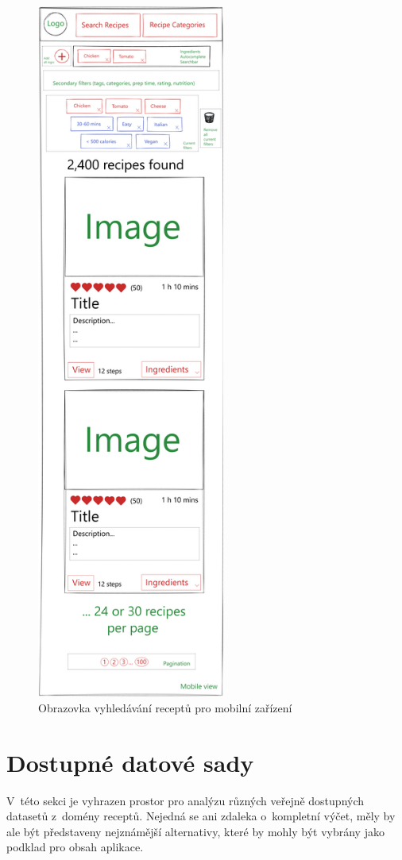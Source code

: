 \begin{figure}[p]\centering
\includegraphics[height=230mm]{../img/mobile-search-view}
\caption{Obrazovka vyhledávání receptů pro mobilní zařízení}
\label{obr01:mobile-search-view}
\end{figure}

\section{Dostupné datové sady}

V~této sekci je vyhrazen prostor pro analýzu různých veřejně dostupných datasetů z~domény receptů. Nejedná se ani zdaleka o~kompletní výčet, měly by ale být představeny nejznámější alternativy, které by mohly být vybrány jako podklad pro obsah aplikace. 

